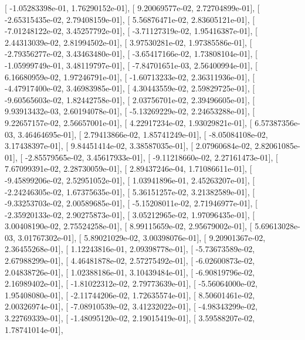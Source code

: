 \documentclass{article}
\begin{document}
       [ -1.05283398e-01,   1.76290152e-01],
       [  9.20069577e-02,   2.72704899e-01],
       [ -2.65315435e-02,   2.79408159e-01],
       [  5.56876471e-02,   2.83605121e-01],
       [ -7.01248122e-02,   3.45257792e-01],
       [ -3.71127319e-02,   1.95416387e-01],
       [  2.44313039e-02,   2.81994502e-01],
       [  3.97530281e-02,   1.97385586e-01],
       [ -2.79356277e-02,   3.43463480e-01],
       [ -3.65417166e-02,   1.73808104e-01],
       [ -1.05999749e-01,   3.48119797e-01],
       [ -7.84701651e-03,   2.56400994e-01],
       [  6.16680959e-02,   1.97246791e-01],
       [ -1.60713233e-02,   2.36311936e-01],
       [ -4.47917400e-02,   3.46983985e-01],
       [  4.30443559e-02,   2.59829725e-01],
       [ -9.60565603e-02,   1.82442758e-01],
       [  2.03756701e-02,   2.39496605e-01],
       [  9.93913432e-03,   2.60194078e-01],
       [ -5.13269229e-02,   2.24653288e-01],
       [  9.22657157e-02,   2.56657001e-01],
       [  4.22917234e-02,   1.93029821e-01],
       [  6.57387356e-03,   3.46464695e-01],
       [  2.79413866e-02,   1.85741249e-01],
       [ -8.05084108e-02,   3.17438397e-01],
       [  9.84451414e-02,   3.38587035e-01],
       [  2.07960684e-02,   2.82061085e-01],
       [ -2.85579565e-02,   3.45617933e-01],
       [ -9.11218660e-02,   2.27161473e-01],
       [  7.67099391e-02,   2.28730059e-01],
       [  2.89437246e-04,   1.71086611e-01],
       [ -9.45899206e-02,   2.52951052e-01],
       [  1.03941896e-01,   2.45263207e-01],
       [ -2.24246305e-02,   1.67375635e-01],
       [  5.36151257e-02,   3.21382589e-01],
       [ -9.33253703e-02,   2.00589685e-01],
       [ -5.15208011e-02,   2.71946977e-01],
       [ -2.35920133e-02,   2.90275873e-01],
       [  3.05212965e-02,   1.97096435e-01],
       [  3.00408190e-02,   2.75524258e-01],
       [  8.99115659e-02,   2.95679002e-01],
       [  5.69613028e-03,   3.01767302e-01],
       [  5.89021029e-02,   3.00398076e-01],
       [  9.20901367e-02,   2.36455268e-01],
       [  1.12243816e-01,   2.09398778e-01],
       [ -5.73673589e-02,   2.67988299e-01],
       [  4.46481878e-02,   2.57275492e-01],
       [ -6.02600873e-02,   2.04838726e-01],
       [  1.02388186e-01,   3.10439484e-01],
       [ -6.90819796e-02,   2.16989402e-01],
       [ -1.81022312e-02,   2.79773639e-01],
       [ -5.56064000e-02,   1.95408080e-01],
       [ -2.11744206e-02,   1.72635574e-01],
       [  8.50601461e-02,   2.00326974e-01],
       [ -7.08910539e-02,   3.41232022e-01],
       [ -4.98343299e-02,   3.22769339e-01],
       [ -1.48095120e-02,   2.19015419e-01],
       [  3.59588207e-02,   1.78741014e-01],
\end{document}
